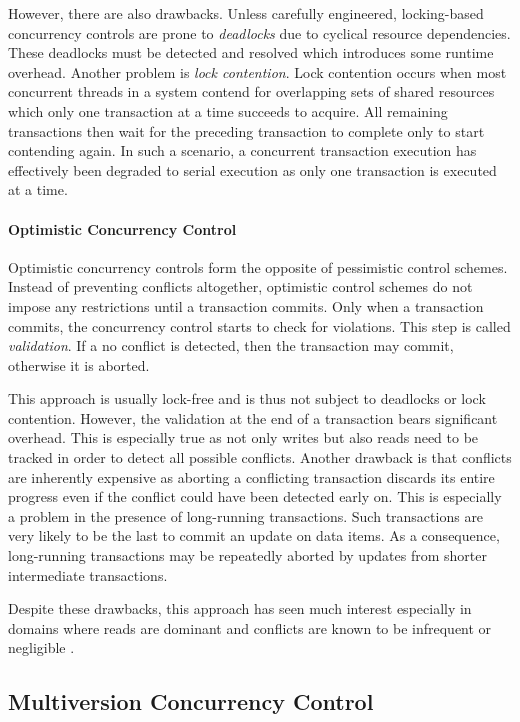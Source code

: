 However, there are also drawbacks. Unless carefully engineered, locking-based
concurrency controls are prone to \emph{deadlocks} due to cyclical resource
dependencies. These deadlocks must be detected and resolved which introduces
some runtime overhead. Another problem is \emph{lock contention}. Lock
contention occurs when most concurrent threads in a system contend for
overlapping sets of shared resources which only one transaction at a time
succeeds to acquire. All remaining transactions then wait for the preceding
transaction to complete only to start contending again. In such a scenario, a
concurrent transaction execution has effectively been degraded to serial
execution as only one transaction is executed at a time.

\paragraph{Optimistic Concurrency Control} %

Optimistic concurrency controls form the opposite of pessimistic control
schemes. Instead of preventing conflicts altogether, optimistic control schemes
do not impose any restrictions until a transaction commits. Only when a
transaction commits, the concurrency control starts to check for violations.
This step is called \emph{validation}. If a no conflict is detected, then the
transaction may commit, otherwise it is aborted.

This approach is usually lock-free and is thus not subject to deadlocks or lock
contention. However, the validation at the end of a transaction bears
significant overhead. This is especially true as not only writes but also reads
need to be tracked in order to detect all possible conflicts. Another drawback
is that conflicts are inherently expensive as aborting a conflicting transaction
discards its entire progress even if the conflict could have been detected early
on. This is especially a problem in the presence of long-running transactions.
Such transactions are very likely to be the last to commit an update on data
items. As a consequence, long-running transactions may be repeatedly aborted by
updates from shorter intermediate transactions.

Despite these drawbacks, this approach has seen much interest especially in
domains where reads are dominant and conflicts are known to be infrequent or
negligible \cite{kung1981optimistic, carey1986performance, larson2011high}.

\subsection{Multiversion Concurrency Control}

